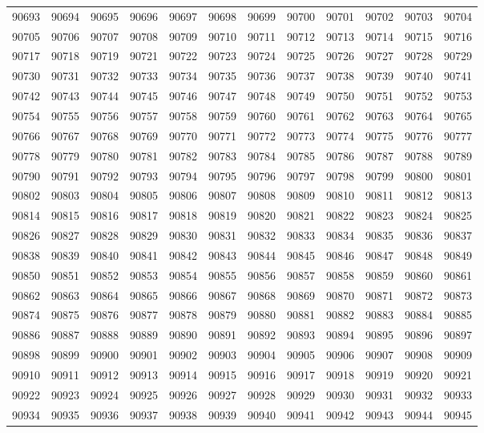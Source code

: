 \begin{center}
\begin{longtable}{llllllllllll}
90693 &90694 &90695 &90696 &90697 &90698 &90699 &90700 &90701 &90702 &90703 &90704 \\
90705 &90706 &90707 &90708 &90709 &90710 &90711 &90712 &90713 &90714 &90715 &90716 \\
90717 &90718 &90719 &90721 &90722 &90723 &90724 &90725 &90726 &90727 &90728 &90729 \\
90730 &90731 &90732 &90733 &90734 &90735 &90736 &90737 &90738 &90739 &90740 &90741 \\
90742 &90743 &90744 &90745 &90746 &90747 &90748 &90749 &90750 &90751 &90752 &90753 \\
90754 &90755 &90756 &90757 &90758 &90759 &90760 &90761 &90762 &90763 &90764 &90765 \\
90766 &90767 &90768 &90769 &90770 &90771 &90772 &90773 &90774 &90775 &90776 &90777 \\
90778 &90779 &90780 &90781 &90782 &90783 &90784 &90785 &90786 &90787 &90788 &90789 \\
90790 &90791 &90792 &90793 &90794 &90795 &90796 &90797 &90798 &90799 &90800 &90801 \\
90802 &90803 &90804 &90805 &90806 &90807 &90808 &90809 &90810 &90811 &90812 &90813 \\
90814 &90815 &90816 &90817 &90818 &90819 &90820 &90821 &90822 &90823 &90824 &90825 \\
90826 &90827 &90828 &90829 &90830 &90831 &90832 &90833 &90834 &90835 &90836 &90837 \\
90838 &90839 &90840 &90841 &90842 &90843 &90844 &90845 &90846 &90847 &90848 &90849 \\
90850 &90851 &90852 &90853 &90854 &90855 &90856 &90857 &90858 &90859 &90860 &90861 \\
90862 &90863 &90864 &90865 &90866 &90867 &90868 &90869 &90870 &90871 &90872 &90873 \\
90874 &90875 &90876 &90877 &90878 &90879 &90880 &90881 &90882 &90883 &90884 &90885 \\
90886 &90887 &90888 &90889 &90890 &90891 &90892 &90893 &90894 &90895 &90896 &90897 \\
90898 &90899 &90900 &90901 &90902 &90903 &90904 &90905 &90906 &90907 &90908 &90909 \\
90910 &90911 &90912 &90913 &90914 &90915 &90916 &90917 &90918 &90919 &90920 &90921 \\
90922 &90923 &90924 &90925 &90926 &90927 &90928 &90929 &90930 &90931 &90932 &90933 \\
90934 &90935 &90936 &90937 &90938 &90939 &90940 &90941 &90942 &90943 &90944 &90945 \\

\end{longtable}
\end{center}
